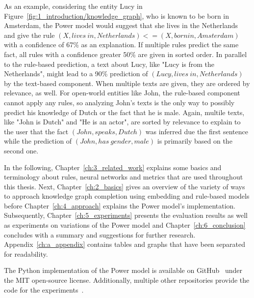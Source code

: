 As an example, considering the entity Lucy in Figure~\ref{fig:1_introduction/knowledge_graph}, who is known to be born in Amsterdam, the Power model would suggest that she lives in the Netherlands and give the rule $(X, lives~in, Netherlands) <= (X, born in, Amsterdam)$ with a confidence of 67\% as an explanation. If multiple rules predict the same fact, all rules with a confidence greater 50\% are given in sorted order. In parallel to the rule-based prediction, a text about Lucy, like "Lucy is from the Netherlands", might lead to a 90\% prediction of $(Lucy, lives~in, Netherlands)$ by the text-based component. When multiple texts are given, they are ordered by relevance, as well. For open-world entities like John, the rule-based component cannot apply any rules, so analyzing John's texts is the only way to possibly predict his knowledge of Dutch or the fact that he is male. Again, multile texts, like "John is Dutch" and "He is an actor", are sorted by relevance to explain to the user that the fact $(John, speaks, Dutch)$ was inferred due the first sentence while the prediction of $(John, has~gender, male)$ is primarily based on the second one.

In the following, Chapter~\ref{ch:3_related_work} explains some basics and terminology about rules, neural networks and metrics that are used throughout this thesis. Next, Chapter~\ref{ch:2_basics} gives an overview of the variety of ways to approach knowledge graph completion using embedding and rule-based models before Chapter~\ref{ch:4_approach} explains the Power model's implementation. Subsequently, Chapter~\ref{ch:5_experiments} presents the evaluation results as well as experiments on variations of the Power model and Chapter~\ref{ch:6_conclusion} concludes with a summary and suggestions for further research. Appendix~\ref{ch:a_appendix} contains tables and graphs that have been separated for readability.

The Python implementation of the Power model is available on GitHub~\cite{GitHubPower} under the MIT open-source license. Additionally, multiple other repositories provide the code for the experiments~\cite{}.
